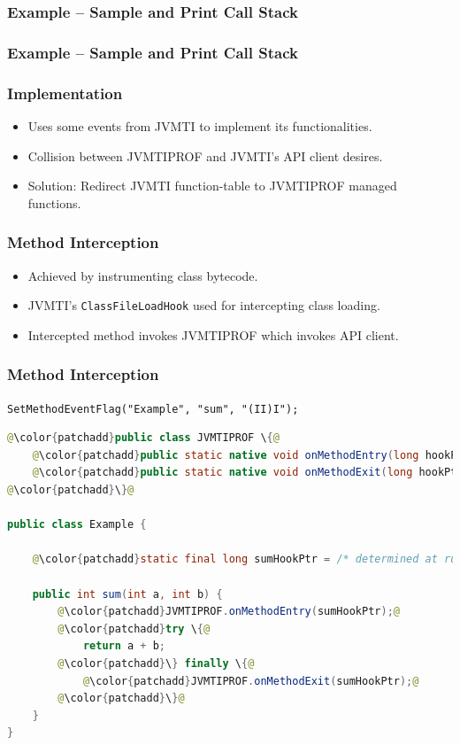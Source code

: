 \documentclass{beamer}
\begin{document}
\begin{frame}
\frametitle{Example -- Sample and Print Call Stack}

\end{frame}

\begin{frame}
\frametitle{Example -- Sample and Print Call Stack}

\end{frame}

\begin{frame}
\frametitle{Implementation}
\begin{itemize}
\item Uses some events from JVMTI to implement its functionalities.
\item Collision between JVMTIPROF and JVMTI's API client desires.
\item Solution: Redirect JVMTI function-table to JVMTIPROF managed functions.
\end{itemize}
\end{frame}

\begin{frame}
\frametitle{Method Interception}
\begin{itemize}
\item Achieved by instrumenting class bytecode.
\item JVMTI's \lstinline{ClassFileLoadHook} used for intercepting class loading.
\item Intercepted method invokes JVMTIPROF which invokes API client.
\end{itemize}
\end{frame}

\begin{frame}[fragile]
\frametitle{Method Interception}
\centering
\lstinline{SetMethodEventFlag("Example", "sum", "(II)I");}
\medskip
\begin{lstlisting}[language=Java,frame=tbrl,escapechar=@,basicstyle=\tiny,xleftmargin=0.2\textwidth,xrightmargin=0.2\textwidth]
@\color{patchadd}public class JVMTIPROF \{@
    @\color{patchadd}public static native void onMethodEntry(long hookPtr);@
    @\color{patchadd}public static native void onMethodExit(long hookPtr);@
@\color{patchadd}\}@

public class Example {

    @\color{patchadd}static final long sumHookPtr = /* determined at runtime */;@

    public int sum(int a, int b) {
        @\color{patchadd}JVMTIPROF.onMethodEntry(sumHookPtr);@
        @\color{patchadd}try \{@
            return a + b;
        @\color{patchadd}\} finally \{@
            @\color{patchadd}JVMTIPROF.onMethodExit(sumHookPtr);@
        @\color{patchadd}\}@
    }
}
\end{lstlisting}
\end{frame}
\end{document}
